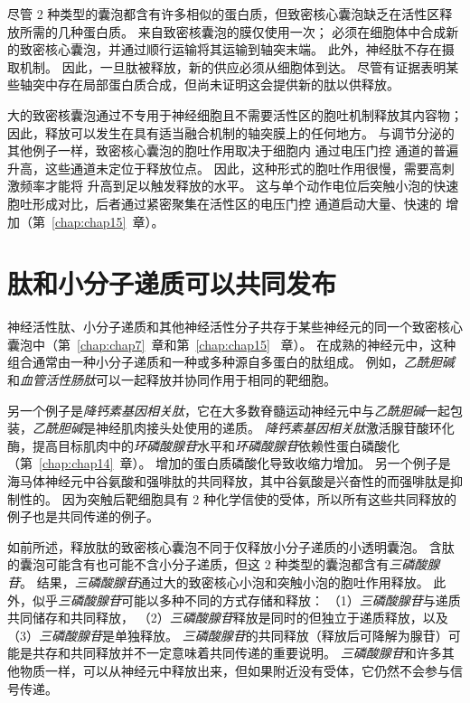 尽管 2 种类型的囊泡都含有许多相似的蛋白质，但致密核心囊泡缺乏在活性区释放所需的几种蛋白质。
来自致密核囊泡的膜仅使用一次； 必须在细胞体中合成新的致密核心囊泡，并通过顺行运输将其运输到轴突末端。
此外，神经肽不存在摄取机制。
因此，一旦肽被释放，新的供应必须从细胞体到达。
尽管有证据表明某些轴突中存在局部蛋白质合成，但尚未证明这会提供新的肽以供释放。


大的致密核囊泡通过不专用于神经细胞且不需要活性区的胞吐机制释放其内容物；
因此，释放可以发生在具有适当融合机制的轴突膜上的任何地方。
与调节分泌的其他例子一样，致密核心囊泡的胞吐作用取决于细胞内  通过电压门控  通道的普遍升高，这些通道未定位于释放位点。
因此，这种形式的胞吐作用很慢，需要高刺激频率才能将  升高到足以触发释放的水平。
这与单个动作电位后突触小泡的快速胞吐形成对比，后者通过紧密聚集在活性区的电压门控  通道启动大量、快速的  增加（第~\ref{chap:chap15}~章）。



\section{肽和小分子递质可以共同发布}

神经活性肽、小分子递质和其他神经活性分子共存于某些神经元的同一个致密核心囊泡中（第~\ref{chap:chap7}~章和第~\ref{chap:chap15} ~章）。
在成熟的神经元中，这种组合通常由一种小分子递质和一种或多种源自多蛋白的肽组成。
例如，\textit{乙酰胆碱}和\textit{血管活性肠肽}可以一起释放并协同作用于相同的靶细胞。


另一个例子是\textit{降钙素基因相关肽}，它在大多数脊髓运动神经元中与\textit{乙酰胆碱}一起包装，\textit{乙酰胆碱}是神经肌肉接头处使用的递质。
\textit{降钙素基因相关肽}激活腺苷酸环化酶，提高目标肌肉中的\textit{环磷酸腺苷}水平和\textit{环磷酸腺苷}依赖性蛋白磷酸化（第~\ref{chap:chap14}~章）。
增加的蛋白质磷酸化导致收缩力增加。
另一个例子是海马体神经元中谷氨酸和强啡肽的共同释放，其中谷氨酸是兴奋性的而强啡肽是抑制性的。
因为突触后靶细胞具有 2 种化学信使的受体，所以所有这些共同释放的例子也是共同传递的例子。


如前所述，释放肽的致密核心囊泡不同于仅释放小分子递质的小透明囊泡。
含肽的囊泡可能含有也可能不含小分子递质，但这 2 种类型的囊泡都含有\textit{三磷酸腺苷}。
结果，\textit{三磷酸腺苷}通过大的致密核心小泡和突触小泡的胞吐作用释放。
此外，似乎\textit{三磷酸腺苷}可能以多种不同的方式存储和释放：
（1）\textit{三磷酸腺苷}与递质共同储存和共同释放，
（2）\textit{三磷酸腺苷}释放是同时的但独立于递质释放，以及 
（3）\textit{三磷酸腺苷}是单独释放。
\textit{三磷酸腺苷}的共同释放（释放后可降解为腺苷）可能是共存和共同释放并不一定意味着共同传递的重要说明。
\textit{三磷酸腺苷}和许多其他物质一样，可以从神经元中释放出来，但如果附近没有受体，它仍然不会参与信号传递。


